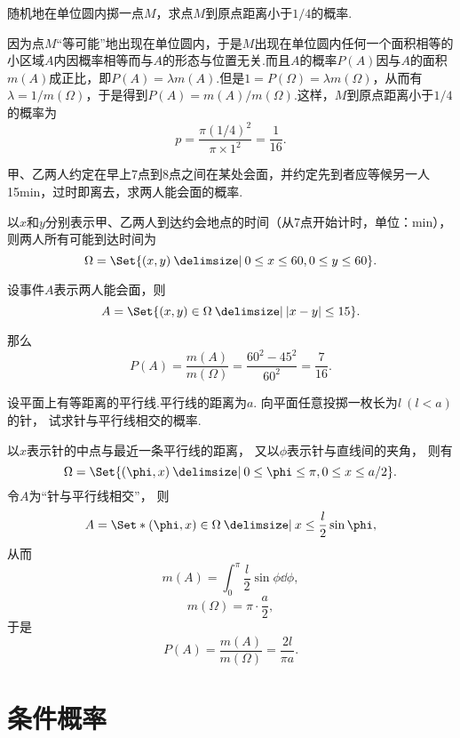 \begin{example}
随机地在单位圆内掷一点\(M\)，求点\(M\)到原点距离小于\(1/4\)的概率.
\begin{solution}
因为点\(M\)“等可能”地出现在单位圆内，于是\(M\)出现在单位圆内任何一个面积相等的小区域\(A\)内因概率相等而与\(A\)的形态与位置无关.而且\(A\)的概率\(P(A)\)因与\(A\)的面积\(m(A)\)成正比，即\(P(A)=\lambda m(A)\).但是\(1 = P(\Omega) = \lambda m(\Omega)\)，从而有\(\lambda = 1/m(\Omega)\)，于是得到\(P(A) = m(A)/m(\Omega)\).这样，\(M\)到原点距离小于\(1/4\)的概率为\[
p = \frac{\pi (1/4)^2}{\pi \times 1^2} = \frac{1}{16}.
\]
\end{solution}
\end{example}

\begin{example}[会面问题]
甲、乙两人约定在早上7点到8点之间在某处会面，并约定先到者应等候另一人15min，过时即离去，求两人能会面的概率.
\begin{solution}
以\(x\)和\(y\)分别表示甲、乙两人到达约会地点的时间（从7点开始计时，单位：min），则两人所有可能到达时间为\[
\Omega = \Set{ (x,y) \given 0 \leq x \leq 60, 0 \leq y \leq 60 }.
\]

设事件\(A\)表示两人能会面，则\[
A = \Set{ (x,y)\in\Omega \given \abs{x-y} \leq 15 }.
\]

那么\[
P(A) = \frac{m(A)}{m(\Omega)} = \frac{60^2 - 45^2}{60^2} = \frac{7}{16}.
\]
\end{solution}
\end{example}

\begin{example}[布冯投针问题]
设平面上有等距离的平行线.平行线的距离为\(a\).
向平面任意投掷一枚长为\(l\ (l<a)\)的针，
试求针与平行线相交的概率.
\begin{solution}
以\(x\)表示针的中点与最近一条平行线的距离，
又以\(\phi\)表示针与直线间的夹角，
则有\[
	\Omega = \Set{ (\phi,x) \given 0 \leq \phi \leq \pi, 0 \leq x \leq a/2 }.
\]
令\(A\)为“针与平行线相交”，
则\[
	A = \Set*{ (\phi,x)\in\Omega \given x \leq \frac{l}{2} \sin\phi },
\]
从而\[
	m(A) = \int_0^{\pi}\frac{l}{2} \sin\phi \dd{\phi},
\]\[
	m(\Omega) = \pi \cdot \frac{a}{2},
\]
于是\[
	P(A)
	= \frac{m(A)}{m(\Omega)}
	= \frac{2l}{\pi a}.
\]
\end{solution}
\end{example}

\section{条件概率}

